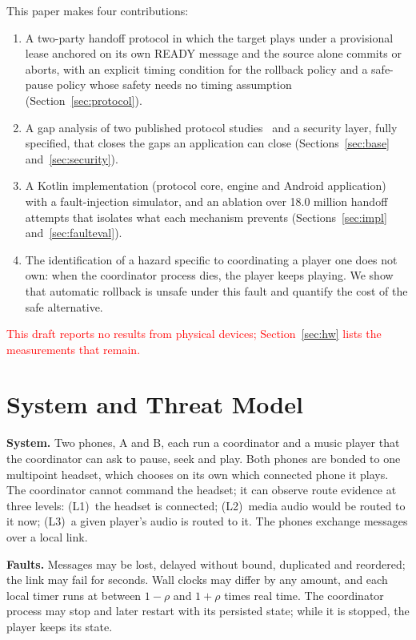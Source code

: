 \documentclass[conference]{IEEEtran}
\newcommand{\draftnote}[1]{\textcolor{red}{#1}}
\begin{document}
This paper makes four contributions:
\begin{enumerate}
\item A two-party handoff protocol in which the target plays under a provisional lease anchored on its own READY message and the source alone commits or aborts, with an explicit timing condition for the rollback policy and a safe-pause policy whose safety needs no timing assumption (Section~\ref{sec:protocol}).
\item A gap analysis of two published protocol studies~\cite{stute2021,antonioli2019} and a security layer, fully specified, that closes the gaps an application can close (Sections~\ref{sec:base} and~\ref{sec:security}).
\item A Kotlin implementation (protocol core, engine and Android application) with a fault-injection simulator, and an ablation over 18.0 million handoff attempts that isolates what each mechanism prevents (Sections~\ref{sec:impl} and~\ref{sec:faulteval}).
\item The identification of a hazard specific to coordinating a player one does not own: when the coordinator process dies, the player keeps playing. We show that automatic rollback is unsafe under this fault and quantify the cost of the safe alternative.
\end{enumerate}

\draftnote{This draft reports no results from physical devices; Section~\ref{sec:hw} lists the measurements that remain.}

\section{System and Threat Model}\label{sec:model}

\textbf{System.} Two phones, A and B, each run a coordinator and a music player that the coordinator can ask to pause, seek and play. Both phones are bonded to one multipoint headset, which chooses on its own which connected phone it plays. The coordinator cannot command the headset; it can observe route evidence at three levels: (L1)~the headset is connected; (L2)~media audio would be routed to it now; (L3)~a given player's audio is routed to it. The phones exchange messages over a local link.

\textbf{Faults.} Messages may be lost, delayed without bound, duplicated and reordered; the link may fail for seconds. Wall clocks may differ by any amount, and each local timer runs at between $1-\rho$ and $1+\rho$ times real time. The coordinator process may stop and later restart with its persisted state; while it is stopped, the player keeps its state.
\end{document}
